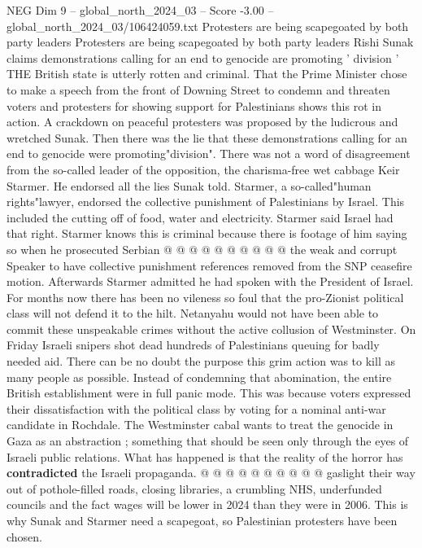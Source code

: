 \begin{textsample}{NEG Dim 9 – global\_north\_2024\_03 – Score -3.00 – global\_north\_2024\_03/106424059.txt}  \label{ex:f9_neg_176}
Protesters are being scapegoated by both party leaders Protesters are being scapegoated by both party leaders Rishi Sunak claims demonstrations calling for an end to genocide are promoting ' division ' THE British state is utterly rotten and criminal.
That the Prime Minister chose to make a speech from the front of Downing Street to condemn and threaten voters and protesters for showing support for Palestinians shows this rot in action.
A crackdown on peaceful protesters was proposed by the ludicrous and wretched Sunak.
Then there was the lie that these demonstrations calling for an end to genocide were promoting"division".
There was not a word of disagreement from the so-called leader of the opposition, the charisma-free wet cabbage Keir Starmer.
He endorsed all the lies Sunak told.
Starmer, a so-called"human rights"lawyer, endorsed the collective punishment of Palestinians by Israel.
This included the cutting off of food, water and electricity.
Starmer said Israel had that right.
Starmer knows this is criminal because there is footage of him saying so when he prosecuted Serbian @ @ @ @ @ @ @ @ @ @ the weak and corrupt Speaker to have collective punishment references removed from the SNP ceasefire motion.
Afterwards Starmer admitted he had spoken with the President of Israel.
For months now there has been no vileness so foul that the pro-Zionist political class will not defend it to the hilt.
Netanyahu would not have been able to commit these unspeakable crimes without the active collusion of Westminster.
On Friday Israeli snipers shot dead hundreds of Palestinians queuing for badly needed aid.
There can be no doubt the purpose this grim action was to kill as many people as possible.
Instead of condemning that abomination, the entire British establishment were in full panic mode.
This was because voters expressed their dissatisfaction with the political class by voting for a nominal anti-war candidate in Rochdale.
The Westminster cabal wants to treat the genocide in Gaza as an abstraction ; something that should be seen only through the eyes of Israeli public relations.
What has happened is that the reality of the horror has \textbf{contradicted} the Israeli propaganda. @ @ @ @ @ @ @ @ @ @ gaslight their way out of pothole-filled roads, closing libraries, a crumbling NHS, underfunded councils and the fact wages will be lower in 2024 than they were in 2006.
This is why Sunak and Starmer need a scapegoat, so Palestinian protesters have been chosen.

\end{textsample}
